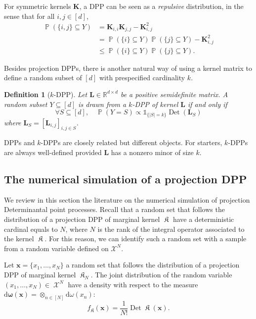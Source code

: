 \documentclass[twoside,11pt]{book}
\newtheorem{definition}{Definition}
\DeclareMathOperator{\Det}{Det}
\DeclareMathOperator{\Prb}{\mathbb{P}}
\DeclareMathOperator*{\KDPP}{\mathfrak{K}}
\DeclareMathOperator{\X}{\mathcal{X}}
\begin{document}
For symmetric kernels $\bm{K}$, a DPP can be seen as a \emph{repulsive} distribution, in the sense that for all $i,j\in [d]$,
\begin{align}
  \Prb(\{i,j\} \subseteq Y) &= \bm{K}_{i,i} \bm{K}_{j,j} - \bm{K}^2_{i,j}\\
  &= \Prb(\{i\} \subseteq Y)\Prb(\{j\} \subseteq Y) - \bm{K}^2_{i,j}\\
  &\leq \Prb(\{i\} \subseteq Y)\Prb(\{j\} \subseteq Y).
\end{align}

Besides projection DPPs, there is another natural way of using a kernel matrix to define a random subset of $[d]$ with prespecified cardinality $k$.
\begin{definition}[$k$-DPP]\label{def:kDPP}
Let $\bm{L} \in \mathbb{R}^{d\times d}$ be a positive semidefinite matrix.
A random subset $Y \subseteq [d]$ is drawn from a $k$-DPP of kernel $\bm{L}$ if and only if
\begin{equation}\label{eq:def_kdpp}
\forall S \subseteq [d],\quad \Prb(Y = S) \propto \mathbb{1}_{\{\vert S\vert = k\}}\Det(\bm{L}_{S})
\end{equation}
where $\bm{L}_{S} = [\bm{L}_{i,j}]_{i,j \in S}$.
\end{definition}
DPPs and $k$-DPPs are closely related but different objects. For starters, $k$-DPPs are always well-defined provided $\bm{L}$ has a nonzero minor of size $k$.


\subsection{The numerical simulation of a projection DPP}
We review in this section the literature on the numerical simulation of projection Determinantal point processes. Recall that a random set that follows the distribution of a projection DPP of marginal kernel $\KDPP$ have a deterministic cardinal equals to $N$, where $N$ is the rank of the integral operator associated to the kernel $\KDPP$. For this reason, we can identify such a random set with a sample from a random variable defined on $\mathcal{X}^{N}$.

Let $\bm{x} = \{x_{1}, \dots, x_{N}\}$ a random set that follows the distribution of a projection DPP of marginal kernel $\KDPP_{N}$. The joint distribution of the random variable $(x_{1}, \dots, x_{N}) \in \X^{N}$ have a density with respect to the measure $\mathrm{d}\bm{\omega}(\bm{x}) = \otimes_{n\in [N]}\mathrm{d}\omega(x_{n})$:
\begin{equation}\label{eq:det_density}
f_{\KDPP}(\bm{x}) = \frac{1}{N!}\Det \bm{\KDPP}(\bm{x}).
\end{equation}
\end{document}
